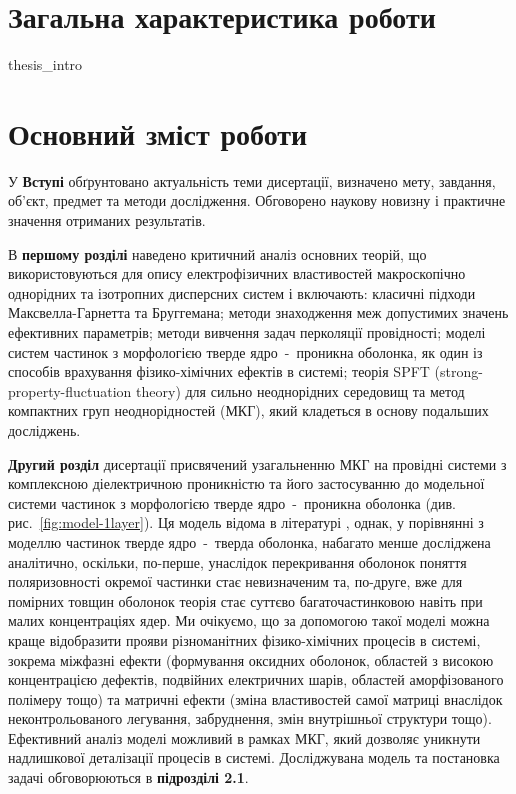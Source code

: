 \documentclass[twoside,a4paper,14pt]{vakaref}
\begin{document}
\part{Загальна характеристика роботи}
{thesis_intro}

\part{Основний зміст роботи}

У {\bf Вступі} обґрунтовано актуальність теми дисертації, 
визначено мету, завдання, об'єкт, предмет та методи 
дослідження. Обговорено наукову новизну і практичне
значення отриманих результатів.

В {\bf першому розділі} наведено критичний аналіз основних теорій, що використовуються для опису електрофізичних властивостей макроскопічно однорідних та ізотропних дисперсних систем і включають: класичні підходи Макс\-велла-Гарнетта та Бруггемана; 
методи знаходження меж допустимих значень ефективних параметрів;
методи вивчення задач перколяції провідності;
моделі систем частинок з морфологією тверде ядро~-~проникна оболонка, як один із способів врахування фізико-хімічних ефектів в системі;
теорія SPFT (strong-property-fluctuation theory) для сильно неоднорідних середовищ та метод компактних груп неоднорідностей (МКГ), який кладеться в основу подальших досліджень.

{\bf Другий розділ} дисертації присвячений узагальненню МКГ \cite{Sushko2007, Sushko2009, SushkoJPD2009, Sushko2017} на провідні системи з комплексною діелектричною проникністю та його застосуванню до модельної системи частинок з морфологією тверде ядро~-~проникна оболонка (див. рис.~\ref{fig:model-1layer}).
Ця модель відома в літературі \cite{Torquato}, однак, у порівнянні з моделлю частинок тверде ядро~-~тверда оболонка, набагато менше досліджена аналітично, оскільки, по-перше, унаслідок перекривання оболонок поняття поляризовності окремої частинки стає невизначеним та, по-друге, вже для помірних товщин оболонок теорія стає суттєво багаточастинковою навіть при малих концентраціях ядер. Ми очікуємо, що за допомогою такої моделі можна краще відобразити прояви різноманітних фізико-хімічних процесів в системі, зокрема міжфазні ефекти (формування оксидних оболонок, областей з високою концентрацією дефектів, подвійних електричних шарів, областей аморфізованого полімеру тощо) та матричні ефекти (зміна властивостей самої матриці внаслідок неконтрольованого легування, забруднення, змін внутрішньої структури тощо). Ефективний аналіз моделі можливий в рамках МКГ, який дозволяє уникнути надлишкової деталізації процесів в системі. Досліджувана модель та постановка задачі обговорюються в {\bf підрозділі 2.1}.
\end{document}
